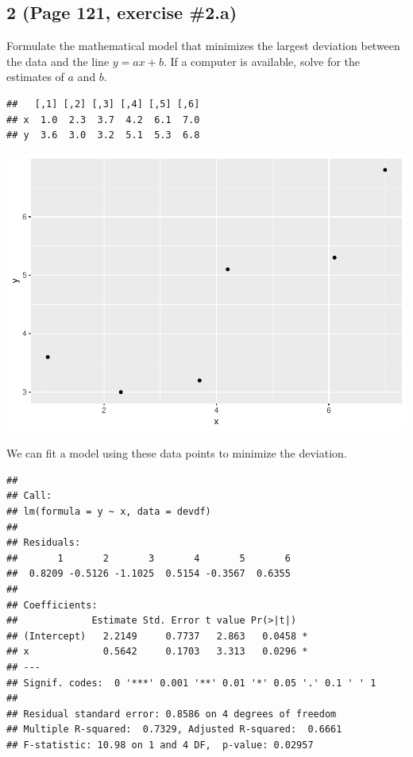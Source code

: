 \documentclass[]{article}
\begin{document}
\hypertarget{page-121-exercise-2.a}{%
\subsection{2 (Page 121, exercise \#2.a)}\label{page-121-exercise-2.a}}

Formulate the mathematical model that minimizes the largest deviation
between the data and the line \(y = ax + b\). If a computer is
available, solve for the estimates of \(a\) and \(b\).

\begin{verbatim}
##   [,1] [,2] [,3] [,4] [,5] [,6]
## x  1.0  2.3  3.7  4.2  6.1  7.0
## y  3.6  3.0  3.2  5.1  5.3  6.8
\end{verbatim}

\includegraphics{Joshua_Sturm_Homework3_files/figure-latex/unnamed-chunk-2-1.pdf}

We can fit a model using these data points to minimize the deviation.

\begin{verbatim}
## 
## Call:
## lm(formula = y ~ x, data = devdf)
## 
## Residuals:
##       1       2       3       4       5       6 
##  0.8209 -0.5126 -1.1025  0.5154 -0.3567  0.6355 
## 
## Coefficients:
##             Estimate Std. Error t value Pr(>|t|)  
## (Intercept)   2.2149     0.7737   2.863   0.0458 *
## x             0.5642     0.1703   3.313   0.0296 *
## ---
## Signif. codes:  0 '***' 0.001 '**' 0.01 '*' 0.05 '.' 0.1 ' ' 1
## 
## Residual standard error: 0.8586 on 4 degrees of freedom
## Multiple R-squared:  0.7329, Adjusted R-squared:  0.6661 
## F-statistic: 10.98 on 1 and 4 DF,  p-value: 0.02957
\end{verbatim}
\end{document}
